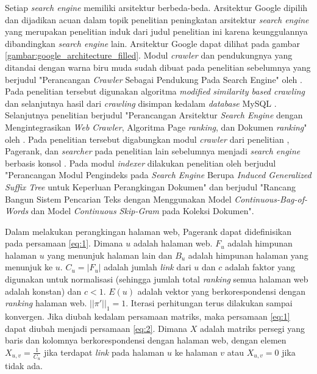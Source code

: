 Setiap \textit{search engine} memiliki arsitektur berbeda-beda. Arsitektur Google dipilih dan dijadikan acuan dalam topik penelitian peningkatan arsitektur \textit{search engine} yang merupakan penelitian induk dari judul penelitian ini karena keunggulannya dibandingkan \textit{search engine} lain. Arsitektur Google dapat dilihat pada gambar \ref{gambar:google_architecture_filled}. Modul \textit{crawler} dan pendukungnya yang ditandai dengan warna biru muda sudah dibuat pada penelitian sebelumnya yang berjudul "Perancangan \textit{Crawler} Sebagai Pendukung Pada Search Engine" oleh \citet{qoriiba2021perancangan}. Pada penelitian tersebut digunakan algoritma \textit{modified similarity based crawling} dan selanjutnya hasil dari \textit{crawling} disimpan kedalam \textit{database} MySQL \citep{qoriiba2021perancangan}. Selanjutnya penelitian berjudul "Perancangan Arsitektur \textit{Search Engine} dengan Mengintegrasikan \textit{Web Crawler}, Algoritma Page \textit{ranking}, dan Dokumen \textit{ranking}" oleh \citet{khatulistiwa2022SearchEngine}. Pada penelitian tersebut digabungkan modul \textit{crawler} dari penelitian \citet{qoriiba2021perancangan}, Pagerank, dan \textit{searcher} pada penelitian lain sebelumnya menjadi \textit{search engine} berbasis konsol \citep{khatulistiwa2022SearchEngine}. Pada modul \textit{indexer} dilakukan penelitian oleh \citet{pratama2022indexer} berjudul "Perancangan Modul Pengindeks pada \textit{Search Engine} Berupa \textit{Induced Generalized Suffix Tree} untuk Keperluan Perangkingan Dokumen" dan \citet{zalghornain2022indexer} berjudul "Rancang Bangun Sistem Pencarian Teks dengan Menggunakan Model \textit{Continuous-Bag-of-Words} dan Model \textit{Continuous Skip-Gram} pada Koleksi Dokumen".

Dalam melakukan perangkingan halaman web, Pagerank dapat didefinisikan pada persamaan \ref{eq:1}. Dimana $u$ adalah halaman web. $F_u$ adalah himpunan halaman $u$ yang menunjuk halaman lain dan $B_u$ adalah himpunan halaman yang menunjuk ke $u$. $C_u = |F_u|$ adalah jumlah \textit{link} dari $u$ dan $c$ adalah faktor yang digunakan untuk normalisasi (sehingga jumlah total \textit{ranking} semua halaman web adalah konstan) dan $c < 1$. $E(u)$ adalah vektor yang berkorespondensi dengan \textit{ranking} halaman web. $||\pi'||_1 = 1$. Iterasi perhitungan terus dilakukan sampai konvergen. Jika diubah kedalam persamaan matriks, maka persamaan \ref{eq:1} dapat diubah menjadi persamaan \ref{eq:2}. Dimana $X$ adalah matriks persegi yang baris dan kolomnya berkorespondensi dengan halaman web, dengan elemen $X_{u,v} = \frac{1}{C_u}$ jika terdapat \textit{link} pada halaman $u$ ke halaman $v$ atau $X_{u,v} = 0$ jika tidak ada.

